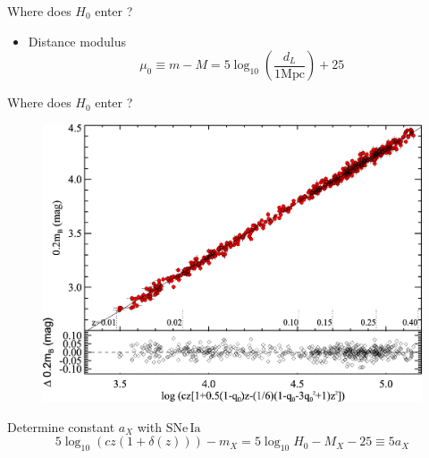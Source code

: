\documentclass{beamer}
\newcommand{\SNe}{\mathrm{SNe\,Ia}}
\begin{document}
\begin{frame}{Where does $H_0$ enter ?}
\begin{itemize}
\item[] Distance modulus
\begin{equation*}
\mu_0 \equiv m - M = 5 \log_{10} \left(\frac{d_L}{1 \mathrm{Mpc}} \right) + 25 \,  \label{Eq:distance-modulus}
\end{equation*}%
\end{itemize}
\end{frame}


\begin{frame}{Where does $H_0$ enter ?}
\begin{figure}[hbtp]
\centering
\includegraphics[scale=0.8]{../figures/chapter-h0/Hubble-diagram.jpg}
\end{figure}

Determine constant $a_X$ with $\SNe$
\begin{equation*}\label{Eq:av-definition}
5 \log_{10} ( c z ( 1+\delta(z) )) - m_X = 5 \log_{10} H_0 - M_X - 25 \equiv 5 a_X 
\end{equation*}
\end{frame}
\end{document}
